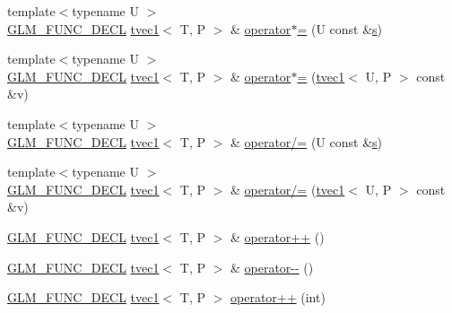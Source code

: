 \begin{DoxyCompactItemize}
\item 
{\footnotesize template$<$typename U $>$ }\\\hyperlink{setup_8hpp_ab2d052de21a70539923e9bcbf6e83a51}{G\+L\+M\+\_\+\+F\+U\+N\+C\+\_\+\+D\+E\+CL} \hyperlink{structglm_1_1detail_1_1tvec1}{tvec1}$<$ T, P $>$ \& \hyperlink{structglm_1_1detail_1_1tvec1_a7ca0f64a6ab86fa34d4b5f23a9db58d2}{operator$\ast$=} (U const \&\hyperlink{structglm_1_1detail_1_1tvec1_a1025b03a3e1f99c7a42518af40737d7b}{s})
\item 
{\footnotesize template$<$typename U $>$ }\\\hyperlink{setup_8hpp_ab2d052de21a70539923e9bcbf6e83a51}{G\+L\+M\+\_\+\+F\+U\+N\+C\+\_\+\+D\+E\+CL} \hyperlink{structglm_1_1detail_1_1tvec1}{tvec1}$<$ T, P $>$ \& \hyperlink{structglm_1_1detail_1_1tvec1_ada2594a8dd2c0ec4e9a20ec18469668c}{operator$\ast$=} (\hyperlink{structglm_1_1detail_1_1tvec1}{tvec1}$<$ U, P $>$ const \&v)
\item 
{\footnotesize template$<$typename U $>$ }\\\hyperlink{setup_8hpp_ab2d052de21a70539923e9bcbf6e83a51}{G\+L\+M\+\_\+\+F\+U\+N\+C\+\_\+\+D\+E\+CL} \hyperlink{structglm_1_1detail_1_1tvec1}{tvec1}$<$ T, P $>$ \& \hyperlink{structglm_1_1detail_1_1tvec1_aad8c386f7278e9a5685ada9a1a0ef7df}{operator/=} (U const \&\hyperlink{structglm_1_1detail_1_1tvec1_a1025b03a3e1f99c7a42518af40737d7b}{s})
\item 
{\footnotesize template$<$typename U $>$ }\\\hyperlink{setup_8hpp_ab2d052de21a70539923e9bcbf6e83a51}{G\+L\+M\+\_\+\+F\+U\+N\+C\+\_\+\+D\+E\+CL} \hyperlink{structglm_1_1detail_1_1tvec1}{tvec1}$<$ T, P $>$ \& \hyperlink{structglm_1_1detail_1_1tvec1_ae74bb46e4d3fd5fdccb1ee6744cbf493}{operator/=} (\hyperlink{structglm_1_1detail_1_1tvec1}{tvec1}$<$ U, P $>$ const \&v)
\item 
\hyperlink{setup_8hpp_ab2d052de21a70539923e9bcbf6e83a51}{G\+L\+M\+\_\+\+F\+U\+N\+C\+\_\+\+D\+E\+CL} \hyperlink{structglm_1_1detail_1_1tvec1}{tvec1}$<$ T, P $>$ \& \hyperlink{structglm_1_1detail_1_1tvec1_ae4514c5de0b75209187c80ed65fdd392}{operator++} ()
\item 
\hyperlink{setup_8hpp_ab2d052de21a70539923e9bcbf6e83a51}{G\+L\+M\+\_\+\+F\+U\+N\+C\+\_\+\+D\+E\+CL} \hyperlink{structglm_1_1detail_1_1tvec1}{tvec1}$<$ T, P $>$ \& \hyperlink{structglm_1_1detail_1_1tvec1_a777ac8b6fe013405c6015d518a2096a6}{operator-\/-\/} ()
\item 
\hyperlink{setup_8hpp_ab2d052de21a70539923e9bcbf6e83a51}{G\+L\+M\+\_\+\+F\+U\+N\+C\+\_\+\+D\+E\+CL} \hyperlink{structglm_1_1detail_1_1tvec1}{tvec1}$<$ T, P $>$ \hyperlink{structglm_1_1detail_1_1tvec1_a215f0e9af490b7cfce0639fc34e67df7}{operator++} (int)

\end{DoxyCompactItemize}
